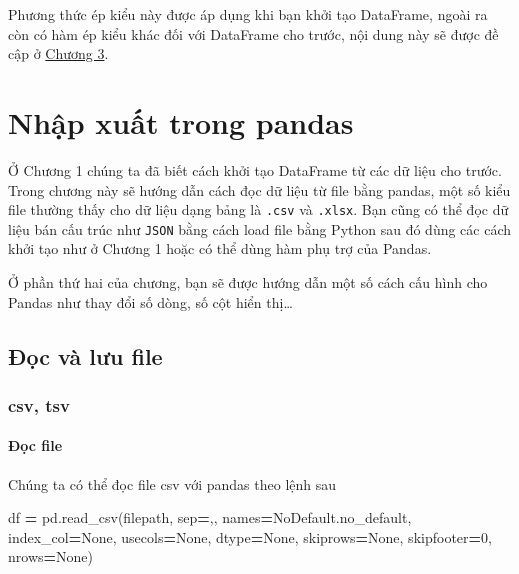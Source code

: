 \documentclass[
]{book}
\newenvironment{Shaded}{\begin{snugshade}}{\end{snugshade}}
\newcommand{\DecValTok}[1]{\textcolor[rgb]{0.00,0.00,0.81}{#1}}
\newcommand{\NormalTok}[1]{#1}
\newcommand{\OperatorTok}[1]{\textcolor[rgb]{0.81,0.36,0.00}{\textbf{#1}}}
\newcommand{\StringTok}[1]{\textcolor[rgb]{0.31,0.60,0.02}{#1}}
\newcommand{\VariableTok}[1]{\textcolor[rgb]{0.00,0.00,0.00}{#1}}
\begin{document}
Phương thức ép kiểu này được áp dụng khi bạn khởi tạo DataFrame, ngoài ra còn có hàm ép kiểu khác đối với DataFrame cho trước, nội dung này sẽ được đề cập ở \hyperref[Chuong-3]{Chương 3}.

\chapter{Nhập xuất trong pandas}\label{nhux1eadp-xuux1ea5t-trong-pandas}

Ở Chương 1 chúng ta đã biết cách khởi tạo DataFrame từ các dữ liệu cho trước.
Trong chương này sẽ hướng dẫn cách đọc dữ liệu từ file bằng pandas, một số kiểu file thường thấy cho dữ liệu dạng bảng là \texttt{.csv} và \texttt{.xlsx}.
Bạn cũng có thể đọc dữ liệu bán cấu trúc như \texttt{JSON} bằng cách load file bằng Python sau đó dùng các cách khởi tạo như ở Chương 1 hoặc có thể dùng
hàm phụ trợ của Pandas.

Ở phần thứ hai của chương, bạn sẽ được hướng dẫn một số cách cấu hình cho Pandas như thay đổi số dòng, số cột hiển thị\ldots{}

\section{Đọc và lưu file}\label{ux111ux1ecdc-vuxe0-lux1b0u-file}

\subsection{csv, tsv}\label{csv-tsv}

\subsubsection{Đọc file}\label{ux111ux1ecdc-file}

Chúng ta có thể đọc file csv với pandas theo lệnh sau

\begin{Shaded}
\begin{Highlighting}[]
\NormalTok{df }\OperatorTok{=}\NormalTok{ pd.read\_csv(filepath, sep}\OperatorTok{=}\StringTok{\textquotesingle{},\textquotesingle{}}\NormalTok{, names}\OperatorTok{=}\NormalTok{NoDefault.no\_default, index\_col}\OperatorTok{=}\VariableTok{None}\NormalTok{, usecols}\OperatorTok{=}\VariableTok{None}\NormalTok{, dtype}\OperatorTok{=}\VariableTok{None}\NormalTok{, skiprows}\OperatorTok{=}\VariableTok{None}\NormalTok{, skipfooter}\OperatorTok{=}\DecValTok{0}\NormalTok{, nrows}\OperatorTok{=}\VariableTok{None}\NormalTok{)}
\end{Highlighting}
\end{Shaded}
\end{document}
